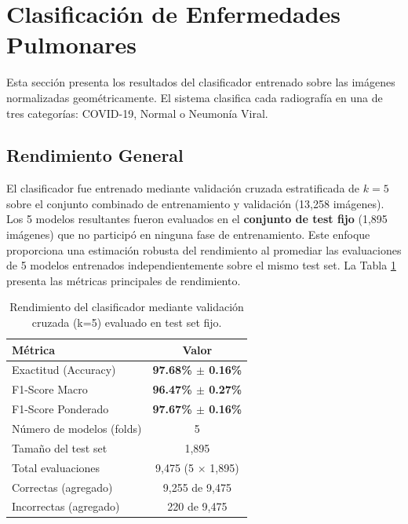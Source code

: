 
\section{Clasificación de Enfermedades Pulmonares}
\label{sec:resultados_clasificacion}

Esta sección presenta los resultados del clasificador entrenado sobre las imágenes normalizadas geométricamente. El sistema clasifica cada radiografía en una de tres categorías: COVID-19, Normal o Neumonía Viral.

\subsection{Rendimiento General}
\label{subsec:metricas_globales}

El clasificador fue entrenado mediante validación cruzada estratificada de $k=5$ sobre el conjunto combinado de entrenamiento y validación (13,258 imágenes). Los 5 modelos resultantes fueron evaluados en el \textbf{conjunto de test fijo} (1,895 imágenes) que no participó en ninguna fase de entrenamiento. Este enfoque proporciona una estimación robusta del rendimiento al promediar las evaluaciones de 5 modelos entrenados independientemente sobre el mismo test set. La Tabla \ref{tab:resultados_clasificacion_global} presenta las métricas principales de rendimiento.

\begin{table}[htbp]
    \centering
    \caption{Rendimiento del clasificador mediante validación cruzada (k=5) evaluado en test set fijo.}
    \label{tab:resultados_clasificacion_global}
    \small
    \begin{tabular}{@{}lc@{}}
        \toprule
        \textbf{Métrica} & \textbf{Valor} \\
        \midrule
        Exactitud (Accuracy) & \textbf{97.68\% $\pm$ 0.16\%} \\
        F1-Score Macro & \textbf{96.47\% $\pm$ 0.27\%} \\
        F1-Score Ponderado & \textbf{97.67\% $\pm$ 0.16\%} \\
        \midrule
        Número de modelos (folds) & 5 \\
        Tamaño del test set & 1,895 \\
        Total evaluaciones & 9,475 (5 $\times$ 1,895) \\
        Correctas (agregado) & 9,255 de 9,475 \\
        Incorrectas (agregado) & 220 de 9,475 \\
        \bottomrule
    \end{tabular}
\end{table}

